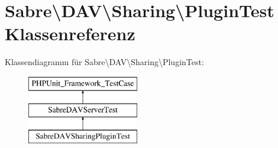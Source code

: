 \hypertarget{class_sabre_1_1_d_a_v_1_1_sharing_1_1_plugin_test}{}\section{Sabre\textbackslash{}D\+AV\textbackslash{}Sharing\textbackslash{}Plugin\+Test Klassenreferenz}
\label{class_sabre_1_1_d_a_v_1_1_sharing_1_1_plugin_test}
Klassendiagramm für Sabre\textbackslash{}D\+AV\textbackslash{}Sharing\textbackslash{}Plugin\+Test\+:\begin{figure}[H]
\begin{center}
\leavevmode
\includegraphics[height=3.000000cm]{class_sabre_1_1_d_a_v_1_1_sharing_1_1_plugin_test}
\end{center}
\end{figure}
